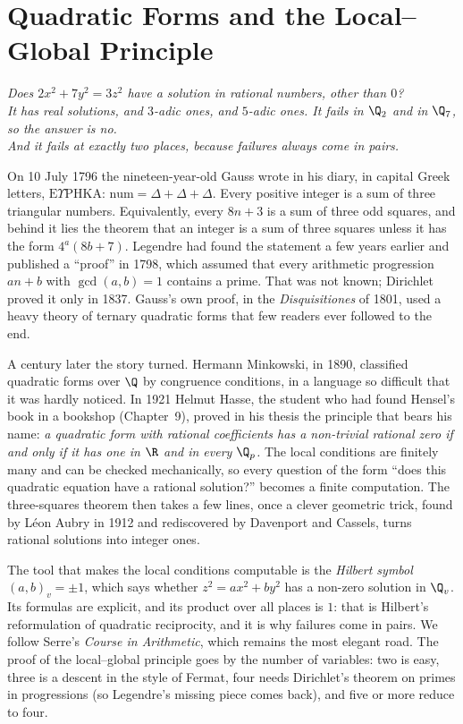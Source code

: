 \chapter{Quadratic Forms and the Local--Global Principle}
\begin{center}\itshape
Does $2x^2+7y^2=3z^2$ have a solution in rational numbers, other than $0$?\\
It has real solutions, and $3$-adic ones, and $5$-adic ones. It fails in $\Q_2$ and in $\Q_7$, so the answer is no.\\
And it fails at exactly two places, because failures always come in pairs.
\end{center}

On 10 July 1796 the nineteen-year-old Gauss wrote in his diary, in capital Greek letters, $\text{E}\Upsilon\text{PHKA}$:
$\text{num}=\Delta+\Delta+\Delta$. Every positive integer is a sum of three triangular numbers. Equivalently, every
$8n+3$ is a sum of three odd squares, and behind it lies the theorem that an integer is a sum of three squares unless it
has the form $4^a(8b+7)$. Legendre had found the statement a few years earlier and published a ``proof'' in 1798, which
assumed that every arithmetic progression $an+b$ with $\gcd(a,b)=1$ contains a prime. That was not known; Dirichlet proved
it only in 1837. Gauss's own proof, in the \emph{Disquisitiones} of 1801, used a heavy theory of ternary quadratic forms that
few readers ever followed to the end.

A century later the story turned. Hermann Minkowski, in 1890, classified quadratic forms over $\Q$ by congruence conditions,
in a language so difficult that it was hardly noticed. In 1921 Helmut Hasse, the student who had found Hensel's book in a
bookshop (Chapter~9), proved in his thesis the principle that bears his name: \emph{a quadratic form with rational
coefficients has a non-trivial rational zero if and only if it has one in $\R$ and in every $\Q_p$.} The local conditions
are finitely many and can be checked mechanically, so every question of the form ``does this quadratic equation have a
rational solution?'' becomes a finite computation. The three-squares theorem then takes a few lines, once a clever
geometric trick, found by L\'eon Aubry in 1912 and rediscovered by Davenport and Cassels, turns rational solutions into
integer ones.

The tool that makes the local conditions computable is the \emph{Hilbert symbol} $(a,b)_v=\pm1$, which says whether
$z^2=ax^2+by^2$ has a non-zero solution in $\Q_v$. Its formulas are explicit, and its product over all places is $1$:
that is Hilbert's reformulation of quadratic reciprocity, and it is why failures come in pairs. We follow Serre's
\emph{Course in Arithmetic}, which remains the most elegant road. The proof of the local--global principle goes by the
number of variables: two is easy, three is a descent in the style of Fermat, four needs Dirichlet's theorem on primes in
progressions (so Legendre's missing piece comes back), and five or more reduce to four.


